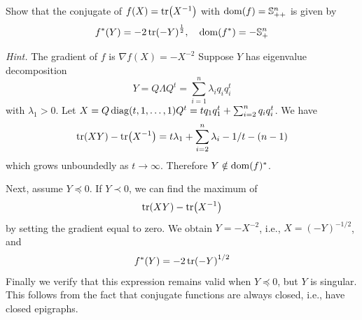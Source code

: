 
\begin{problem}[3.37]
    Show that the conjugate of $f(X) = \tr(X^{-1})$ with $\operatorname{dom}(f) = \mathbb{S}^n_{++}$ is given by\[f^*(Y) = -2\tr(-Y)^{\frac{1}{2}}, \quad \operatorname{dom}(f^*) = -\mathbb{S}_+^n\]

    \textit{Hint.} The gradient of $f$ is $\nabla f(X) = -X^{-2}$
    \Answer Suppose $Y$ has eigenvalue decomposition \[Y = Q\Lambda Q^t = \sum_{i = 1}^n \lambda_i q_i q_i^t\] with $\lambda_1 > 0$. Let $X = Q \operatorname{diag}(t, 1, \dots, 1)Q^t = tq_1q_1^t + \sum_{i = 2}^{n}q_iq_i^t$. We have \[\tr(XY) - \tr(X^{-1}) = t\lambda_1 + \sum_{i = 2}^n\lambda_i - 1 / t - (n - 1)\] which grows unboundedly as $t \to \infty$. Therefore $Y \notin \operatorname{dom}(f)^*$.

    Next, assume $Y \preceq 0$. If $Y \prec 0$, we can find the maximum of \[\tr(XY) - \tr(X^{-1})\] by setting the gradient equal to zero. We obtain $Y = -X^{-2}$, i.e., $X = (-Y)^{-1 / 2}$, and \[f^*(Y) = -2\tr(-Y)^{1 / 2}\]Finally we verify that this expression remains valid when $Y \preceq 0$, but $Y$ is singular. This follows from the fact that conjugate functions are always closed, i.e., have closed epigraphs.
\end{problem}

